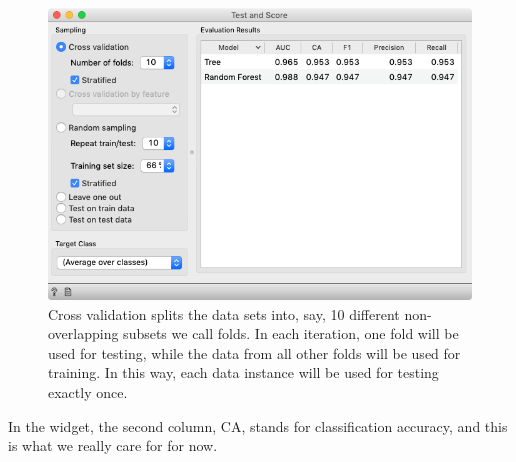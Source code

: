\begin{figure}[h]
    \centering
    \includegraphics[scale=0.4]{graphics/ch-cross_validation/test_and_score.png}
    \caption{Cross validation splits the data sets into, say, 10 different non-overlapping subsets we call folds. In each iteration, one fold will be used for testing, while the data from all other folds will be used for training. In this way, each data instance will be used for testing exactly once.}
\end{figure}

In the  widget, the second column, CA, stands for classification accuracy, and this is what we really care for for now.